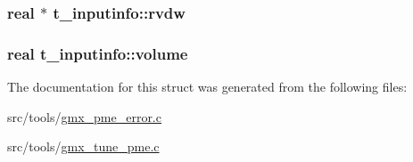 \hypertarget{structt__inputinfo_a9f5c9e3a9f858533ec964ece531d7a78}{
\subsubsection[{rvdw}]{\setlength{\rightskip}{0pt plus 5cm}real $\ast$ {\bf t\-\_\-inputinfo\-::rvdw}}}\label{structt__inputinfo_a9f5c9e3a9f858533ec964ece531d7a78}
\hypertarget{structt__inputinfo_a31b42a83227787a1831dfbac17983fe6}{
\subsubsection[{volume}]{\setlength{\rightskip}{0pt plus 5cm}real {\bf t\-\_\-inputinfo\-::volume}}}\label{structt__inputinfo_a31b42a83227787a1831dfbac17983fe6}


\-The documentation for this struct was generated from the following files\-:\begin{DoxyCompactItemize}
\item 
src/tools/\hyperlink{gmx__pme__error_8c}{gmx\-\_\-pme\-\_\-error.\-c}\item 
src/tools/\hyperlink{gmx__tune__pme_8c}{gmx\-\_\-tune\-\_\-pme.\-c}\end{DoxyCompactItemize}
